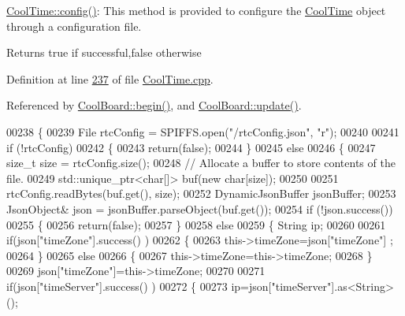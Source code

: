 \hyperlink{class_cool_time_a87c28260c1bc77091162cbcf1ee2e129}{Cool\+Time\+::config()}\+: This method is provided to configure the \hyperlink{class_cool_time}{Cool\+Time} object through a configuration file.

\begin{DoxyReturn}{Returns}
true if successful,false otherwise 
\end{DoxyReturn}


Definition at line \hyperlink{_cool_time_8cpp_source_l00237}{237} of file \hyperlink{_cool_time_8cpp_source}{Cool\+Time.\+cpp}.



Referenced by \hyperlink{_cool_board_8cpp_source_l00021}{Cool\+Board\+::begin()}, and \hyperlink{_cool_board_8cpp_source_l00411}{Cool\+Board\+::update()}.


\begin{DoxyCode}
00238 \{
00239     File rtcConfig = SPIFFS.open(\textcolor{stringliteral}{"/rtcConfig.json"}, \textcolor{stringliteral}{"r"});
00240 
00241     \textcolor{keywordflow}{if} (!rtcConfig) 
00242     \{
00243         \textcolor{keywordflow}{return}(\textcolor{keyword}{false});
00244     \}
00245     \textcolor{keywordflow}{else}
00246     \{
00247         \textcolor{keywordtype}{size\_t} size = rtcConfig.size();
00248         \textcolor{comment}{// Allocate a buffer to store contents of the file.}
00249         std::unique\_ptr<char[]> buf(\textcolor{keyword}{new} \textcolor{keywordtype}{char}[size]);
00250 
00251         rtcConfig.readBytes(buf.get(), size);
00252         DynamicJsonBuffer jsonBuffer;
00253         JsonObject& json = jsonBuffer.parseObject(buf.get());
00254         \textcolor{keywordflow}{if} (!json.success()) 
00255         \{
00256               \textcolor{keywordflow}{return}(\textcolor{keyword}{false});
00257         \} 
00258         \textcolor{keywordflow}{else}
00259         \{   String ip;
00260             
00261             \textcolor{keywordflow}{if}(json[\textcolor{stringliteral}{"timeZone"}].success() )
00262             \{
00263                 this->timeZone=json[\textcolor{stringliteral}{"timeZone"}] ;
00264             \}
00265             \textcolor{keywordflow}{else}
00266             \{
00267                 this->timeZone=this->timeZone;          
00268             \}
00269             json[\textcolor{stringliteral}{"timeZone"}]=this->timeZone;
00270             
00271             \textcolor{keywordflow}{if}(json[\textcolor{stringliteral}{"timeServer"}].success() )
00272             \{           
00273                  ip=json[\textcolor{stringliteral}{"timeServer"}].as<String>();

\end{DoxyCode}

